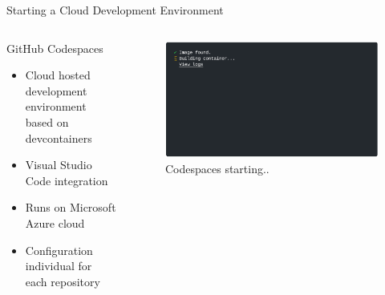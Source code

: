 \documentclass[10pt, aspectratio=169]{beamer}
\begin{document}
\begin{frame}[fragile]{Starting a Cloud Development Environment}
  \begin{columns}
    \begin{column}{0.6\textwidth}
    GitHub Codespaces \footnotemark
    \begin{itemize}
      \item Cloud hosted development environment based on devcontainers
      \item Visual Studio Code integration
      \item Runs on Microsoft Azure cloud
      \item Configuration individual for each repository
    \end{itemize}
    \end{column}
    \begin{column}{0.4\textwidth}
      \begin{figure}
        \includegraphics[width=1.1\textwidth]{images/codespaces_setting_up.png}
        \caption*{Codespaces starting..}
      \end{figure}
    \end{column}
  \end{columns}
\end{frame}
\end{document}
